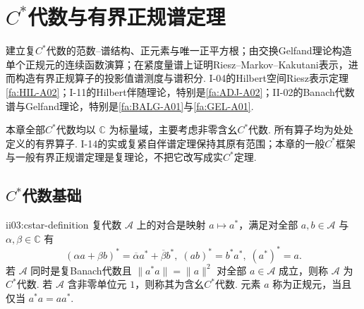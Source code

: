 \chapter{\(\displaystyle C^*\)代数与有界正规谱定理}\label{chap:II-03}
\FAChapterOpening
{建立复\(\displaystyle C^*\)代数的范数--谱结构、正元素与唯一正平方根；由交换Gelfand理论构造单个正规元的连续函数演算；在紧度量谱上证明Riesz--Markov--Kakutani表示，进而构造有界正规算子的投影值谱测度与谱积分.}
{I-04的Hilbert空间Riesz表示定理\autoref{fa:HIL-A02}；I-11的Hilbert伴随理论，特别是\autoref{fa:ADJ-A02}；II-02的Banach代数谱与Gelfand理论，特别是\autoref{fa:BALG-A01}与\autoref{fa:GEL-A01}.}
{\begin{center}
\end{center}}

本章全部\(\displaystyle C^*\)代数均以 \(\displaystyle\mathbb C\) 为标量域，主要考虑非零含幺\(\displaystyle C^*\)代数. 所有算子均为处处定义的有界算子. I-14的实或复紧自伴谱定理保持其原有范围；本章的一般\(\displaystyle C^*\)框架与一般有界正规谱定理是复理论，不把它改写成实\(\displaystyle C^*\)定理.

\section{\(\displaystyle C^*\)代数基础}\label{sec:ii03-cstar-basics}

\begin{FADefinition}{ii03:cstar-definition}
复代数 \(\displaystyle\mathcal A\) 上的对合是映射 \(\displaystyle a\mapsto a^*\)，满足对全部 \(\displaystyle a,b\in\mathcal A\) 与 \(\displaystyle\alpha,\beta\in\mathbb C\) 有
\[
(\alpha a+\beta b)^*=\overline\alpha a^*+\overline\beta b^*,
\;
(ab)^*=b^*a^*,
\;
(a^*)^*=a.
\]
若 \(\displaystyle\mathcal A\) 同时是复Banach代数且
\(\displaystyle \|a^*a\|=\|a\|^2\)
对全部 \(\displaystyle a\in\mathcal A\) 成立，则称 \(\displaystyle\mathcal A\) 为\(\displaystyle C^*\)代数. 若 \(\displaystyle\mathcal A\) 含非零单位元 \(\displaystyle1\)，则称其为含幺\(\displaystyle C^*\)代数. 元素 \(\displaystyle a\) 称为正规元，当且仅当 \(\displaystyle a^*a=aa^*\).
\end{FADefinition}

